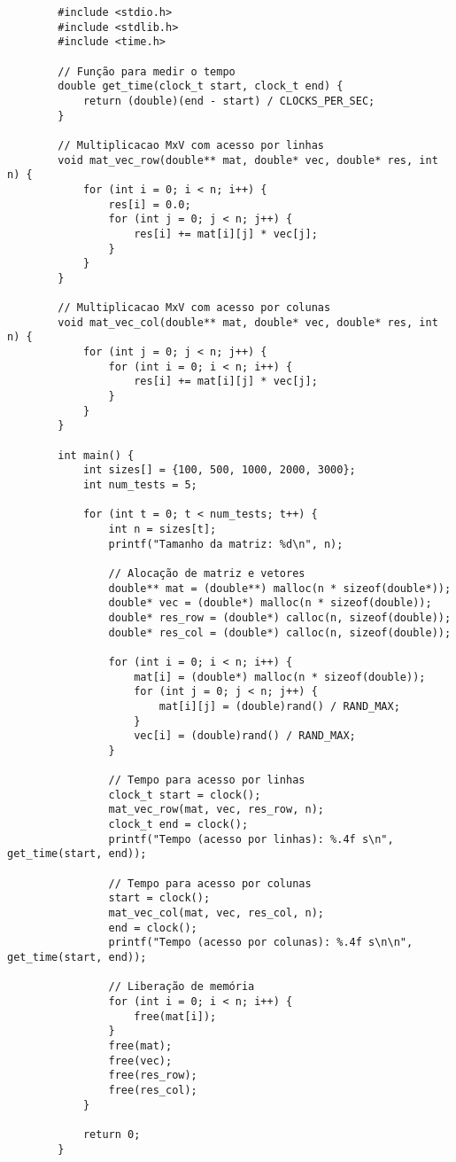\documentclass[a4paper, 12pt]{article}
\begin{document}
	\begin{verbatim}
		#include <stdio.h>
		#include <stdlib.h>
		#include <time.h>
		
		// Função para medir o tempo
		double get_time(clock_t start, clock_t end) {
			return (double)(end - start) / CLOCKS_PER_SEC;
		}
		
		// Multiplicacao MxV com acesso por linhas
		void mat_vec_row(double** mat, double* vec, double* res, int n) {
			for (int i = 0; i < n; i++) {
				res[i] = 0.0;
				for (int j = 0; j < n; j++) {
					res[i] += mat[i][j] * vec[j];
				}
			}
		}
		
		// Multiplicacao MxV com acesso por colunas
		void mat_vec_col(double** mat, double* vec, double* res, int n) {
			for (int j = 0; j < n; j++) {
				for (int i = 0; i < n; i++) {
					res[i] += mat[i][j] * vec[j];
				}
			}
		}
		
		int main() {
			int sizes[] = {100, 500, 1000, 2000, 3000};
			int num_tests = 5;
			
			for (int t = 0; t < num_tests; t++) {
				int n = sizes[t];
				printf("Tamanho da matriz: %d\n", n);
				
				// Alocação de matriz e vetores
				double** mat = (double**) malloc(n * sizeof(double*));
				double* vec = (double*) malloc(n * sizeof(double));
				double* res_row = (double*) calloc(n, sizeof(double));
				double* res_col = (double*) calloc(n, sizeof(double));
				
				for (int i = 0; i < n; i++) {
					mat[i] = (double*) malloc(n * sizeof(double));
					for (int j = 0; j < n; j++) {
						mat[i][j] = (double)rand() / RAND_MAX;
					}
					vec[i] = (double)rand() / RAND_MAX;
				}
				
				// Tempo para acesso por linhas
				clock_t start = clock();
				mat_vec_row(mat, vec, res_row, n);
				clock_t end = clock();
				printf("Tempo (acesso por linhas): %.4f s\n", get_time(start, end));
				
				// Tempo para acesso por colunas
				start = clock();
				mat_vec_col(mat, vec, res_col, n);
				end = clock();
				printf("Tempo (acesso por colunas): %.4f s\n\n", get_time(start, end));
				
				// Liberação de memória
				for (int i = 0; i < n; i++) {
					free(mat[i]);
				}
				free(mat);
				free(vec);
				free(res_row);
				free(res_col);
			}
			
			return 0;
		}
		
	\end{verbatim}
	
	
	
\end{document}
